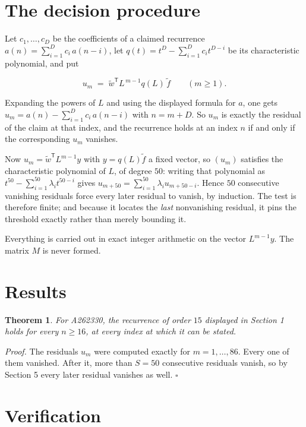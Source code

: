 \documentclass[11pt]{article}
\newtheorem{theorem}{Theorem}
\theoremstyle{definition}
\begin{document}
\section{The decision procedure}

Let $c_1,\dots,c_D$ be the coefficients of a claimed recurrence $a(n) = \sum_{i=1}^{D} c_i\,a(n-i)$, let $q(t) = t^{D} - \sum_{i=1}^{D} c_i t^{D-i}$ be its characteristic polynomial, and put

\[u_m \;=\; \tilde w^{\mathsf T} L^{\,m-1} q(L)\,\tilde f \qquad (m \ge 1).\]

Expanding the powers of $L$ and using the displayed formula for $a$, one gets $u_m = a(n) - \sum_{i=1}^{D} c_i\,a(n-i)$ with $n = m + D$. So $u_m$ is exactly the residual of the claim at that index, and the recurrence holds at an index $n$ if and only if the corresponding $u_m$ vanishes.

Now $u_m = \tilde w^{\mathsf T} L^{m-1} y$ with $y = q(L)\tilde f$ a fixed vector, so $(u_m)$ satisfies the characteristic polynomial of $L$, of degree $50$: writing that polynomial as $t^{50} - \sum_{i=1}^{50} \lambda_i t^{50-i}$ gives $u_{m+50} = \sum_{i=1}^{50} \lambda_i u_{m+50-i}$. Hence $50$ consecutive vanishing residuals force every later residual to vanish, by induction. The test is therefore finite; and because it locates the {\itshape last} nonvanishing residual, it pins the threshold exactly rather than merely bounding it.

Everything is carried out in exact integer arithmetic on the vector $L^{m-1}y$. The matrix $M$ is never formed.

\section{Results}

\begin{theorem} For A262330, the recurrence of order $15$ displayed in Section 1 holds for every $n \ge 16$, at every index at which it can be stated.\end{theorem}

{\itshape Proof.} The residuals $u_m$ were computed exactly for $m = 1,\dots,86$. Every one of them vanished. After it, more than $S = 50$ consecutive residuals vanish, so by Section 5 every later residual vanishes as well. $\square$

\section{Verification}
\end{document}

